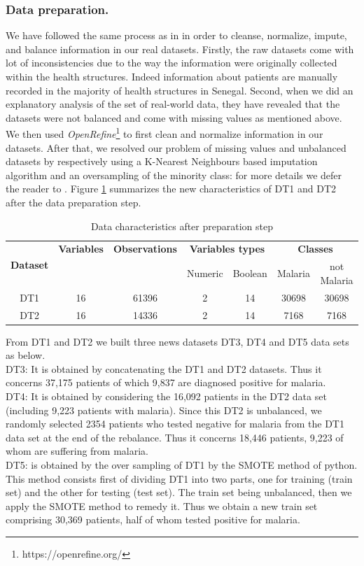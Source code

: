 \subsubsection*{\textbf{Data preparation.}}
We have followed the same process as in 
\cite{mbaye2019towards} in order  to cleanse, normalize, impute, and balance information in our real datasets.  Firstly, the raw datasets come with lot of inconsistencies due to the way the information were originally collected within the health structures. Indeed information about patients are manually recorded in the majority of health structures in Senegal. 
Second, when we did an explanatory analysis of the set of real-world data, they have revealed that the datasets were not balanced  and come with missing values as mentioned above. We then used \emph{OpenRefine}\footnote{https://openrefine.org/} to first clean and normalize information in our datasets. After that, we resolved our problem of missing values and unbalanced datasets by respectively using a K-Nearest Neighbours based imputation algorithm and an oversampling of the minority class: for more details we defer the reader to \cite{mbaye2019towards}. Figure \ref{synthetic_data} summarizes the new characteristics of DT1 and DT2 after the data preparation step. 
\begin{table}[!ht]
\centering
\scriptsize
  \begin{tabular}{ccccccc}
    \toprule
    \multirow{2}{*}{\textbf{Dataset}} &
      \textbf{Variables}&\textbf{Observations}&
      \multicolumn{2}{c}{\textbf{Variables types}}& \multicolumn{2}{c}{\textbf{Classes}} \\
    & & & Numeric & Boolean & Malaria & not Malaria \\
    \midrule
    DT1 &16 & 61396 & 2 &  14& 30698&30698\\
    DT2 & 16 & 14336 & 2 & 14 & 7168&7168\\
    \bottomrule
  \end{tabular}
  \caption{Data characteristics after preparation step}\label{synthetic_data}
\end{table}

From DT1 and DT2 we built three news datasets DT3, DT4 and DT5 data sets as below.\\
 DT3: It is obtained by concatenating the DT1 and DT2 datasets. Thus it concerns 37,175 patients of which 9,837 are diagnosed positive for malaria.\\
DT4: It is obtained by considering the 16,092 patients in the DT2 data set (including 9,223 patients with malaria). Since this DT2 is unbalanced, we randomly selected 2354 patients who tested negative for malaria from the DT1 data set at the end of the rebalance. Thus it concerns 18,446 patients, 9,223 of whom are suffering from malaria.\\
DT5: is obtained by the over sampling of DT1 by the SMOTE method of python. This method consists first of dividing DT1 into two parts, one for training (train set) and the other for testing (test set). The train set being unbalanced, then we apply the SMOTE method to remedy it. Thus we obtain a new train set comprising 30,369 patients, half of whom tested positive for malaria.

